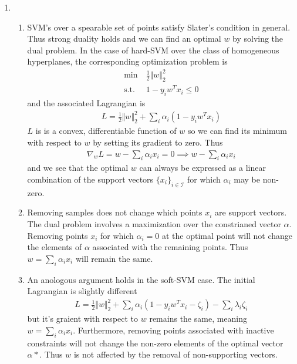 \documentclass[11pt,letter]{article}
\begin{document}
\begin{enumerate}
\item \begin{enumerate}
    \item SVM's over a spearable set of points satisfy Slater's condition in general. Thus strong duality holds and we can find an optimal $w$ by solving the dual problem. In the case of hard-SVM over the class of homogeneous hyperplanes, the corresponding optimization problem is
    \begin{align*}
        \min & \ \frac{1}{2} \Vert w \Vert_2^2 \\
        \text{s.t.} & \ 1 - y_iw^Tx_i \le 0
    \end{align*}
    and the associated Lagrangian is
    \begin{align*}
        L = \frac{1}{2} \Vert w \Vert_2^2 + \sum_i \alpha_i(1 - y_iw^Tx_i)
    \end{align*}
    $L$ is is a convex, differentiable function of $w$ so we can find its minimum with respect to $w$ by setting its gradient to zero. Thus
    \begin{align*}
        \nabla_w L = w - \sum_i\alpha_ix_i = 0 \implies w - \sum_i\alpha_ix_i
    \end{align*}
    and we see that the optimal $w$ can always be expressed as a linear combination of the support vectors $\{x_i\}_{i \in \mathcal I}$ for which $\alpha_i$ may be non-zero.

    \item Removing samples does not change which points $x_i$ are support vectors. The dual problem involves a maximization over the constrianed vector $\alpha$. Removing points $x_i$ for which $\alpha_i = 0$ at the optimal point will not change the elements of $\alpha$ associated with the remaining points. Thus $w = \sum_i\alpha_ix_i$ will remain the same.
    
    \item An anologous argument holds in the soft-SVM case. The initial Lagrangian is slightly different
    \begin{align*}
        L = \frac{1}{2} \Vert w \Vert_2^2 + \sum_i \alpha_i(1 - y_iw^Tx_i - \zeta_i) - \sum_i\lambda_i\zeta_i
    \end{align*} 
    but it's graient with respect to $w$ remains the same, meaning $w = \sum_i\alpha_ix_i$. Furthermore, removing points associated with inactive constraints will not change the non-zero elements of the optimal vector $\alpha*$. Thus $w$ is not affected by the removal of non-supporting vectors.


\end{enumerate}
\end{enumerate}
\end{document}
